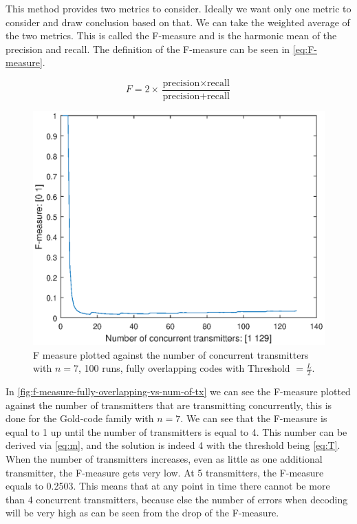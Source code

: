 		This method provides two metrics to consider.
		Ideally we want only one metric to consider and draw conclusion based on that.
		We can take the weighted average of the two metrics.
		This is called the F-measure and is the harmonic mean of the precision and recall.
		The definition of the F-measure can be seen in \autoref{eq:F-measure}.

		\begin{equation}
			\label{eq:F-measure}
			F = 2 \times \frac{\text{precision} \times \text{recall}}{\text{precision} + \text{recall}}
		\end{equation}

		\begin{figure}[h]
			\centering
			\includegraphics[width=\textwidth]{chapters/f-measure-n=7-full-overlap-radio-a=1-100runs.eps}
			\caption{F measure plotted against the number of concurrent transmitters with $n = 7$, 100 runs, fully overlapping codes with Threshold $= \frac{L}{2}$.}
			\label{fig:f-measure-fully-overlapping-vs-num-of-tx}
		\end{figure}

		In \autoref{fig:f-measure-fully-overlapping-vs-num-of-tx} we can see the F-measure plotted against the number of transmitters that are transmitting concurrently, this is done for the Gold-code family with $n = 7$.
		We can see that the F-measure is equal to 1 up until the number of transmitters is equal to 4.
		This number can be derived via \autoref{eq:m}, and the solution is indeed 4 with the threshold being \autoref{eq:T}.
		When the number of transmitters increases, even as little as one additional transmitter, the F-measure gets very low. 
		At 5 transmitters, the F-measure equals to 0.2503. 
		This means that at any point in time there cannot be more than 4 concurrent transmitters, because else the number of errors when decoding will be very high as can be seen from the drop of the F-measure.

